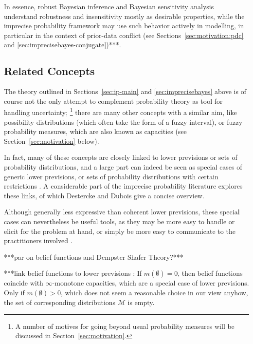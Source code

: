 In essence, robust Bayesian inference and Bayesian sensitivity analysis
understand robustness and insensitivity mostly as desirable properties,
while the imprecise probability framework may use such behavior actively in modelling,
in particular in the context of prior-data conflict
(see Sections~\ref{sec:motivation:pdc} and \ref{sec:imprecisebayes-conjugate})***.


\subsection{Related Concepts}

The theory outlined in Sections~\ref{sec:ip-main} and \ref{sec:imprecisebayes} above
is of course not the only attempt to complement probability theory as tool for handling uncertainty;%
\footnote{A number of motives for going beyond usual probability measures will be discussed in Section~\ref{sec:motivation}.}
there are many other concepts with a similar aim,
like possibility distributions (which often take the form of a fuzzy interval),
or fuzzy probability measures, which are also known as capacities (see Section~\ref{sec:motivation} below).

In fact, many of these concepts are closely linked to
lower previsions or sets of probability distributions,
and a large part can indeed be seen as special cases of generic lower previsions, 
or sets of probability distributions with certain restrictions
\parencite[Fig.~5.5]{itip-special}.
A considerable part of the imprecise probability literature
explores these links, of which Destercke and Dubois \parencite*{itip-other,itip-special}
give a concise overview.


Although generally less expressive than coherent lower previsions,
these special cases can nevertheless be useful tools,
as they may be more easy to handle or elicit for the problem at hand,
or simply be more easy to communicate to the practitioners involved
\parencite[\S 1]{itip-special}.


***par on belief functions and Dempster-Shafer Theory?*** \parencite[\S 2]{itip-other}

***link belief functions to lower previsions \parencite[\S 2.1, p~126]{itip-other}:
If $m(\emptyset) = 0$, then belief functions coincide with $\infty$-monotone capacities,
which are a special case of lower previsions.
Only if $m(\emptyset) > 0$, which does not seem a reasonable choice in our view anyhow,
the set of corresponding distributions $\mathcal{M}$ is empty.



